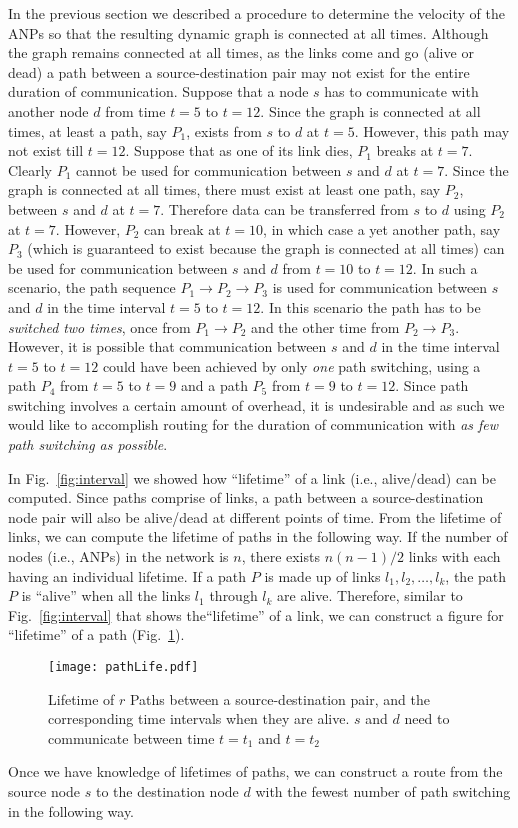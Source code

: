\documentclass[10pt]{IEEEtran}
\begin{document}
In the previous section we described a procedure to determine the velocity of the ANPs so that the resulting dynamic graph is connected at all times. Although the graph remains connected at all times, as the links come and go (alive or dead) a path between a source-destination pair  may not exist for the entire duration of communication. Suppose that a node $s$ has to communicate with another node $d$ from time $t = 5$ to $t = 12$.  Since the graph is connected at all times,  at least a path, say $P_1$, exists from $s$ to $d$ at $t = 5$. However, this path may not exist till $t = 12$. Suppose that as one of its link dies, $P_1$ breaks at $t = 7$. Clearly $P_1$ cannot be used for communication between $s$ and $d$ at $t = 7$. Since the graph is connected at all times, there must exist at least one path, say $P_2$, between $s$ and $d$ at $t = 7$. Therefore data  can be transferred  from $s$ to $d$ using $P_2$ at $t = 7$. However, $P_2$ can break at $t = 10$, in which case a yet another path, say $P_3$ (which is guaranteed to exist because the graph is connected at all times)  can be used for communication between $s$ and $d$ from $t= 10$ to $t = 12$. In such a scenario, the path sequence $P_1 \rightarrow P_2 \rightarrow P_3$ is used for communication between $s$ and $d$ in the time interval $t = 5$ to $t = 12$. In this scenario the path has to be {\em switched} {\em two times}, once from  $P_1 \rightarrow P_2$  and the other time from $P_2 \rightarrow P_3$.  However, it is possible that communication between $s$ and $d$ in the time interval $t = 5$ to $t = 12$ could have been achieved by only {\em one} path switching, using a path $P_4$ from $t = 5$ to $t = 9$ and a path $P_5$ from $t = 9$ to $t = 12$. Since path switching involves a certain amount of overhead, it is undesirable and as such we would like to accomplish routing for the duration of communication with {\em as few path switching as possible}.

In Fig.~\ref{fig:interval} we showed how ``lifetime'' of a link (i.e., alive/dead) can be computed. Since paths comprise of links, a path between a source-destination node pair will also be alive/dead at different points of time. From the lifetime of links, we can compute the lifetime of paths in the following way. If the number of nodes (i.e., ANPs) in the network is $n$, there exists $n(n - 1)/2$ links with each having an individual lifetime. If a path $P$  is made up of links $l_1, l_2, \ldots, l_k$, the path $P$ is ``alive'' when all the links $l_1$ through $l_k$ are alive. Therefore, similar to Fig.~\ref{fig:interval} that shows the``lifetime'' of a link, we can construct a figure for ``lifetime'' of a path (Fig.~\ref{fig:pathLife}).
\begin{figure}[!t]
\centering
\texttt{[image: pathLife.pdf]}
\caption{Lifetime of $r$ Paths between a source-destination pair, and the corresponding time intervals when they are alive. $s$ and $d$ need to communicate between time $t=t_{1}$ and $t=t_{2}$}
\label{fig:pathLife}
\end{figure}
Once we have knowledge of lifetimes of paths, we can construct a route from the source node $s$ to the destination node $d$ with the fewest number of path switching in the following way.
\end{document}
